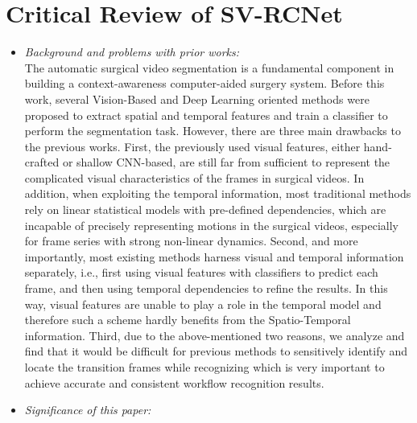 \documentclass[11pt]{article} \usepackage[top=1in, bottom=1in, left=1in, right=1in]{geometry}
\begin{document}
\section{Critical Review of SV-RCNet}
\begin{itemize}
    \item \textit{Background and problems with prior works:}\\
    The automatic surgical video segmentation is a fundamental component in building a context-awareness computer-aided surgery system.  Before this work, several Vision-Based and Deep Learning oriented methods were proposed to extract spatial and temporal features and train a classifier to perform the segmentation task. However, there are three main drawbacks to the previous works.  First, the previously used visual features, either hand-crafted or shallow CNN-based, are still far from sufficient to represent the complicated visual characteristics of the frames in surgical videos. In addition, when exploiting the temporal information, most traditional methods rely on linear statistical models with pre-defined dependencies, which are incapable of precisely representing motions in the surgical videos, especially for frame series with strong non-linear dynamics. Second, and more importantly, most existing methods harness visual and temporal information separately, i.e., first using visual features with classifiers to predict each frame, and then using temporal dependencies to refine the results. In this way, visual features are unable to play a role in the temporal model and therefore such a scheme hardly benefits from the Spatio-Temporal information. Third, due to the above-mentioned two reasons, we analyze and find that it would be difficult for previous methods to sensitively identify and locate the transition frames while recognizing which is very important to achieve accurate and consistent workflow recognition results. \cite{SV-RCNet}
    \item \textit{Significance of this paper:}\\

\end{itemize}
\end{document}
